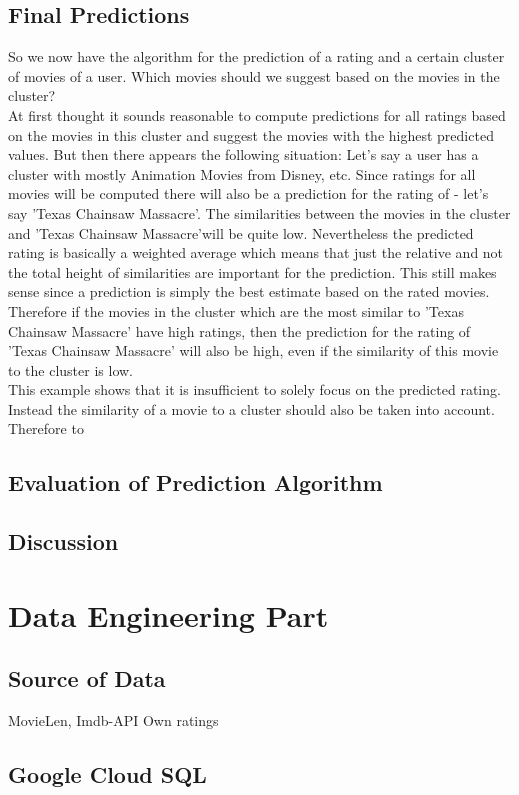 \documentclass{article}
\begin{document}
\subsection{Final Predictions}

So we now have the algorithm for the prediction of a rating and a certain cluster of movies of a user. Which movies should we suggest based on the movies in the cluster?\\
At first thought it sounds reasonable to compute predictions for all ratings based on the movies in this cluster and suggest the movies with the highest predicted values. But then there appears the following situation: Let's say a user has a cluster with mostly Animation Movies from Disney, etc. Since ratings for all movies will be computed there will also be a prediction for the rating of - let's say 'Texas Chainsaw Massacre'. The similarities between the movies in the cluster and 'Texas Chainsaw Massacre'will be quite low. Nevertheless the predicted rating is basically a weighted average which means that just the relative and not the total height of similarities are important for the prediction. This still makes sense since a prediction is simply the best estimate based on the rated movies. Therefore if the movies in the cluster which are the most similar to 'Texas Chainsaw Massacre' have high ratings, then the prediction for the rating of 'Texas Chainsaw Massacre' will also be high, even if the similarity of this movie to the cluster is low.\\
This example shows that it is insufficient to solely focus on the predicted rating. Instead the similarity of a movie to a cluster should also be taken into account.\\
Therefore to  



\subsection{Evaluation of Prediction Algorithm}


\subsection{Discussion}


\section{Data Engineering Part}

\subsection{Source of Data}

MovieLen, Imdb-API
Own ratings


\subsection{Google Cloud SQL}
\end{document}
